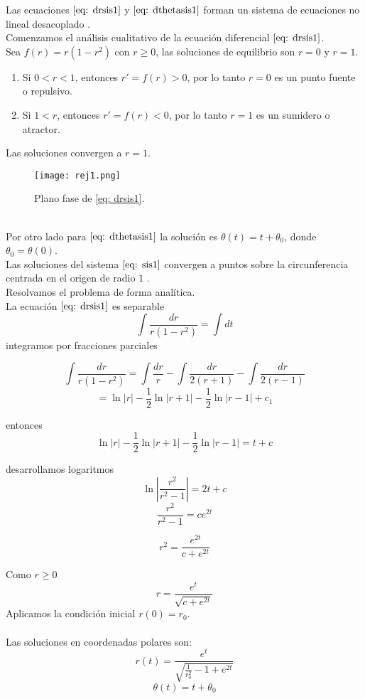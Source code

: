 Las ecuaciones $\eqref{eq: drsis1}$ y $\eqref{eq: dthetasis1}$
forman un sistema de ecuaciones no lineal desacoplado \cite{strogatz2018nonlinear}.\\

Comenzamos el análisis cualitativo de la ecuación diferencial $\eqref{eq: drsis1}$.\\

Sea $f(r)=r(1-r^2)$ con $r\geq0$, las soluciones de equilibrio son $r=0$ y $r=1$.
\begin{enumerate}
	\item Si $0<r<1$, entonces $r'=f(r)>0$, por lo tanto $r=0$ es un punto fuente o repulsivo.
	\item Si $1<r$, entonces $r'=f(r)<0$, por lo tanto $r=1$ es un sumidero o atractor.
\end{enumerate}

Las soluciones convergen a $r=1$.
\begin{figure}[h]
	\centering
	\texttt{[image: rej1.png]}
	\caption{Plano fase de \eqref{eq: drsis1}.}
\end{figure}\\

Por otro lado para $\eqref{eq: dthetasis1}$ la solución es $\theta(t)=t+\theta_0$,
donde $\theta_0=\theta(0)$.\\

Las soluciones del sistema $\eqref{eq: sis1}$ convergen a puntos sobre la
circunferencia centrada en el origen de radio $1$ \cite{wiggins2003introduction}.\\

Resolvamos el problema de forma analítica.\\

La ecuación $\eqref{eq: drsis1}$ es separable
$$\int\frac{dr}{r(1-r^2)}=\int dt$$
integramos por fracciones parciales

$$\int\frac{dr}{r(1-r^2)}=\int\frac{dr}{r}-\int\frac{dr}{2(r+1)}-\int\frac{dr}{2(r-1)}$$
$$=\ln |r|-\frac{1}{2}\ln|r+1|-\frac{1}{2}\ln|r-1|+c_1$$

entonces
$$\ln |r|-\frac{1}{2}\ln|r+1|-\frac{1}{2}\ln|r-1|=t+c$$

desarrollamos logaritmos
$$\ln\left\lvert\frac{r^2}{r^2-1}\right\rvert=2t+c$$
$$\frac{r^2}{r^2-1}=ce^{2t}$$

$$r^2=\frac{e^{2t}}{c+e^{2t}}$$

Como $r\geq 0$
$$r=\frac{e^t}{\sqrt{c+e^{2t}}}$$
Aplicamos la condición inicial $r(0)=r_0$.\\
\\Las soluciones en coordenadas polares son:
\begin{equation}\label{eq: rsis1}
	r(t)=\frac{e^t}{\sqrt{\frac{1}{r_0^2}-1+e^{2t}}}
\end{equation}
\begin{equation}\label{eq: thetasis1}
	\theta(t)=t+\theta_0
\end{equation}


